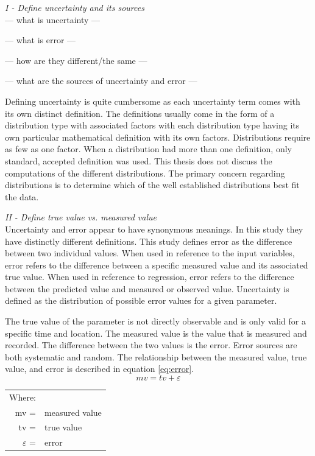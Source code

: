 \begin{linenumbers}
\emph{I - Define  uncertainty and its sources}\\
--- what is uncertainty ---

--- what is error ---

--- how are they different/the same ---

--- what are the sources of uncertainty and error ---

Defining uncertainty is quite cumbersome as each uncertainty term comes with its own distinct definition.  The definitions usually come in the form of a distribution type with associated factors with each distribution type having its own particular mathematical definition with its own factors.  Distributions require as few as one factor.  When a distribution had more than one definition, only standard, accepted definition was used.  This thesis does not discuss the computations of the different distributions.  The primary concern regarding distributions is to determine which of the well established distributions best fit the data.

\emph{II - Define true value vs. measured value}\\
Uncertainty and error appear to have synonymous meanings.  In this study they have distinctly different definitions.  This study defines error as the difference between two individual values.  When used in reference to the input variables, error refers to the difference between a specific measured value and its associated true value.  When used in reference to regression, error refers to the difference between the predicted value and measured or observed value.  Uncertainty is defined as the distribution of possible error values for a given parameter.

The true value of the parameter is not directly observable and is only valid for a specific time and location.  The measured value is the value that is measured and recorded.  The difference between the two values is the error.  Error sources are both systematic and random.  The relationship between the measured value, true value, and error is described in equation \ref{eq:error}.
\begin{equation}
\label{eq:error}
mv=tv+\varepsilon
\end{equation}
\begin{tabularx}{6in}{r X}
Where:&\\
mv = & measured value\\
tv = & true value\\
$\varepsilon$ = & error\\
\end{tabularx}\\


\end{linenumbers}
